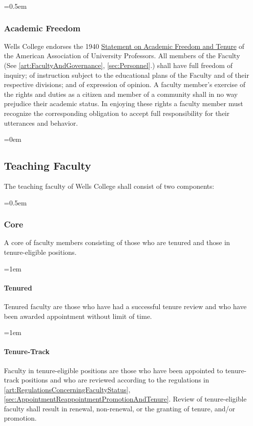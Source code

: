 \documentclass{manual}
\let\oldsubsection\subsection
\renewcommand\subsection{\leftskip=0em\oldsubsection}
\let\oldsubsubsection\subsubsection
\renewcommand\subsubsection{\leftskip=0.5em\oldsubsubsection}
\let\oldparagraph\paragraph
\renewcommand\paragraph{\leftskip=1em\oldparagraph}
\begin{document}
\subsubsection{Academic Freedom} \label{sub:AcademicFreedom}
Wells College endorses the 1940 \href{http://www.aaup.org/AAUP/pubsres/policydocs/contents/1940statement.htm}{Statement on Academic Freedom and Tenure} of the American Association of University Professors. All members of the Faculty (See \cref{art:FacultyAndGovernance}, \cref{sec:Personnel}.) shall have full freedom of inquiry; of instruction subject to the educational plans of the Faculty and of their respective divisions; and of expression of opinion. A faculty member's exercise of the rights and duties as a citizen and member of a community shall in no way prejudice their academic status. In enjoying these rights a faculty member must recognize the corresponding obligation to accept full responsibility for their utterances and behavior.

\subsection{Teaching Faculty}\label{sec:TeachingFaculty}
The teaching faculty of Wells College shall consist of two components:

\subsubsection{Core}\label{sub:Core}
A core of faculty members consisting of those who are tenured and those in tenure-eligible positions.

\paragraph{Tenured} 
Tenured faculty are those who have had a successful tenure review and who have been awarded appointment without limit of time.

\paragraph{Tenure-Track} 
Faculty in tenure-eligible positions are those who have been appointed to tenure-track positions and who are reviewed according to the regulations in \cref{art:RegulationsConcerningFacultyStatus}, \cref{sec:AppointmentReappointmentPromotionAndTenure}. Review of tenure-eligible faculty shall result in renewal, non-renewal, or the granting of tenure, and/or promotion.
\end{document}
